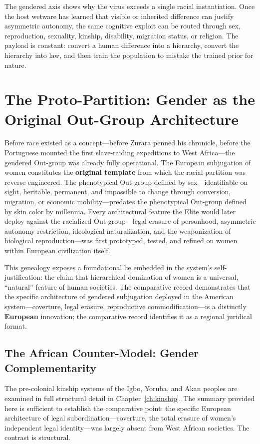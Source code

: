 The gendered axis shows why the virus exceeds a single racial instantiation. Once the host wetware has learned that visible or inherited difference can justify asymmetric autonomy, the same cognitive exploit can be routed through sex, reproduction, sexuality, kinship, disability, migration status, or religion. The payload is constant: convert a human difference into a hierarchy, convert the hierarchy into law, and then train the population to mistake the trained prior for nature.

\section{The Proto-Partition: Gender as the Original Out-Group Architecture}

Before race existed as a concept---before Zurara penned his chronicle, before the Portuguese mounted the first slave-raiding expeditions to West Africa---the gendered Out-group was already fully operational. The European subjugation of women constitutes the \textbf{original template} from which the racial partition was reverse-engineered. The phenotypical Out-group defined by sex---identifiable on sight, heritable, permanent, and impossible to change through conversion, migration, or economic mobility---predates the phenotypical Out-group defined by skin color by millennia. Every architectural feature the Elite would later deploy against the racialized Out-group---legal erasure of personhood, asymmetric autonomy restriction, ideological naturalization, and the weaponization of biological reproduction---was first prototyped, tested, and refined on women within European civilization itself.

This genealogy exposes a foundational lie embedded in the system's self-justification: the claim that hierarchical domination of women is a universal, ``natural'' feature of human societies. The comparative record demonstrates that the specific architecture of gendered subjugation deployed in the American system---coverture, legal erasure, reproductive commodification---is a distinctly \textbf{European} innovation; the comparative record identifies it as a regional juridical format.

\subsection{The African Counter-Model: Gender Complementarity}
\label{sec:african_counter_model}

The pre-colonial kinship systems of the Igbo, Yoruba, and Akan peoples are examined in full structural detail in Chapter~\ref{ch:kinship}. The summary provided here is sufficient to establish the comparative point: the specific European architecture of legal subordination---coverture, the total erasure of women's independent legal identity---was largely absent from West African societies. The contrast is structural.

